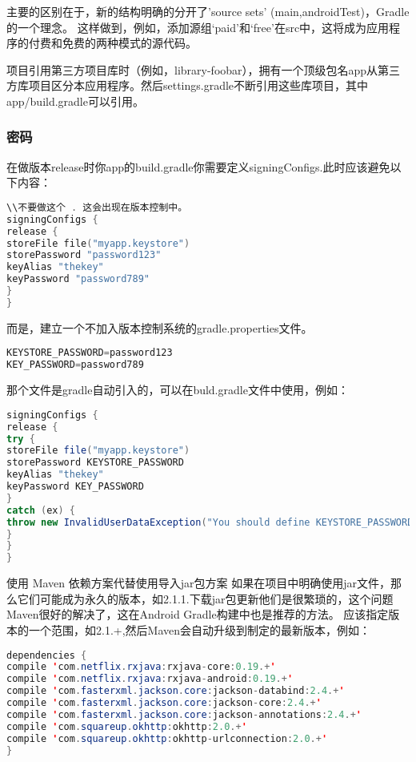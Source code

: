 主要的区别在于，新的结构明确的分开了'source sets' (main,androidTest)，Gradle的一个理念。
这样做到，例如，添加源组‘paid’和‘free’在src中，这将成为应用程序的付费和免费的两种模式的源代码。

项目引用第三方项目库时（例如，library-foobar），拥有一个顶级包名app从第三方库项目区分本应用程序。然后settings.gradle不断引用这些库项目，其中app/build.gradle可以引用。


\subsubsection{密码}
在做版本release时你app的build.gradle你需要定义signingConfigs.此时应该避免以下内容：
\begin{lstlisting}[language=C]
\\不要做这个 . 这会出现在版本控制中。
signingConfigs {  
release {  
storeFile file("myapp.keystore")  
storePassword "password123"  
keyAlias "thekey"  
keyPassword "password789"  
}  
}  
\end{lstlisting}

而是，建立一个不加入版本控制系统的gradle.properties文件。
\begin{lstlisting}[language=C]
KEYSTORE_PASSWORD=password123  
KEY_PASSWORD=password789  
\end{lstlisting}

那个文件是gradle自动引入的，可以在buld.gradle文件中使用，例如：
\begin{lstlisting}[language=java]
signingConfigs {  
release {  
try {  
storeFile file("myapp.keystore")  
storePassword KEYSTORE_PASSWORD  
keyAlias "thekey"  
keyPassword KEY_PASSWORD  
}  
catch (ex) {  
throw new InvalidUserDataException("You should define KEYSTORE_PASSWORD and KEY_PASSWORD in gradle.properties.")  
}  
}  
}  
\end{lstlisting}

使用 Maven 依赖方案代替使用导入jar包方案 如果在项目中明确使用jar文件，那么它们可能成为永久的版本，如2.1.1.下载jar包更新他们是很繁琐的，这个问题Maven很好的解决了，这在Android Gradle构建中也是推荐的方法。
应该指定版本的一个范围，如2.1.+,然后Maven会自动升级到制定的最新版本，例如：
\begin{lstlisting}[language=java]
dependencies {  
compile 'com.netflix.rxjava:rxjava-core:0.19.+'  
compile 'com.netflix.rxjava:rxjava-android:0.19.+'  
compile 'com.fasterxml.jackson.core:jackson-databind:2.4.+'  
compile 'com.fasterxml.jackson.core:jackson-core:2.4.+'  
compile 'com.fasterxml.jackson.core:jackson-annotations:2.4.+'  
compile 'com.squareup.okhttp:okhttp:2.0.+'  
compile 'com.squareup.okhttp:okhttp-urlconnection:2.0.+'  
}  
\end{lstlisting}
